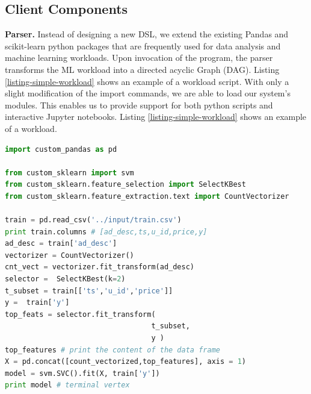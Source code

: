 \subsection{Client Components}
\textbf{Parser. }
Instead of designing a new DSL, we extend the existing Pandas and scikit-learn \cite{sklearn_api} python packages that are frequently used for data analysis and machine learning workloads.
Upon invocation of the program, the parser transforms the ML workload into a directed acyclic Graph (DAG).
Listing \ref{listing-simple-workload} shows an example of a workload script.
With only a slight modification of the import commands, we are able to load our system's modules.
This enables us to provide support for both python scripts and interactive Jupyter notebooks.
Listing \ref{listing-simple-workload} shows an example of a workload.
\begin{lstlisting}[language=Python, caption=Example script,captionpos=b,label = {listing-simple-workload}]
import custom_pandas as pd

from custom_sklearn import svm
from custom_sklearn.feature_selection import SelectKBest
from custom_sklearn.feature_extraction.text import CountVectorizer

train = pd.read_csv('../input/train.csv') 
print train.columns # [ad_desc,ts,u_id,price,y]
ad_desc = train['ad_desc']
vectorizer = CountVectorizer()
cnt_vect = vectorizer.fit_transform(ad_desc)
selector =  SelectKBest(k=2)
t_subset = train[['ts','u_id','price']]
y =  train['y']
top_feats = selector.fit_transform(
                                  t_subset,  
                                  y )
top_features # print the content of the data frame		     
X = pd.concat([count_vectorized,top_features], axis = 1)
model = svm.SVC().fit(X, train['y'])
print model # terminal vertex
\end{lstlisting}


